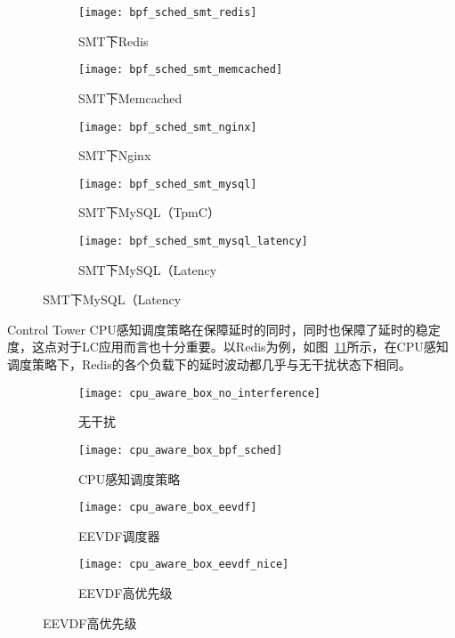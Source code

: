 \begin{figure}[H]
    \centering
    \begin{subfigure}[b]{0.32\textwidth}
        \texttt{[image: bpf\_sched\_smt\_redis]}
        \caption{\quad SMT下Redis}
        \label{fig:bpf_sched_smt_redis}
    \end{subfigure}
    \begin{subfigure}[b]{0.32\textwidth}
        \texttt{[image: bpf\_sched\_smt\_memcached]}
        \caption{\quad SMT下Memcached}
        \label{fig:bpf_sched_smt_memcached}
    \end{subfigure}
    \begin{subfigure}[b]{0.32\textwidth}
        \texttt{[image: bpf\_sched\_smt\_nginx]}
        \caption{\quad SMT下Nginx}
        \label{fig:bpf_sched_smt_nginx}
    \end{subfigure}
    \begin{subfigure}[b]{0.32\textwidth}
        \texttt{[image: bpf\_sched\_smt\_mysql]}
        \caption{\quad SMT下MySQL（TpmC）}
        \label{fig:bpf_sched_smt_mysql}
    \end{subfigure}
    \begin{subfigure}[b]{0.32\textwidth}
        \texttt{[image: bpf\_sched\_smt\_mysql\_latency]}
        \caption{\quad SMT下MySQL（Latency}
        \label{fig:bpf_sched_smt_mysql_latency}
    \end{subfigure}
\label{fig:lc_bpf_sched_smt}
\end{figure}

Control Tower CPU感知调度策略在保障延时的同时，同时也保障了延时的稳定度，这点对于LC应用而言也十分重要。以Redis为例，如图~\ref{fig:latency_box}所示，在CPU感知调度策略下，Redis的各个负载下的延时波动都几乎与无干扰状态下相同。

\begin{figure}[H]
    \centering
    \begin{subfigure}[b]{0.35\textwidth}
        \texttt{[image: cpu\_aware\_box\_no\_interference]}
        \caption{无干扰}
        \label{fig:cpu_aware_box_no_interference}
    \end{subfigure}
    \begin{subfigure}[b]{0.35\textwidth}
        \texttt{[image: cpu\_aware\_box\_bpf\_sched]}
        \caption{CPU感知调度策略}
        \label{fig:cpu_aware_box_bpf_sched}
    \end{subfigure}
    \begin{subfigure}[b]{0.35\textwidth}
        \texttt{[image: cpu\_aware\_box\_eevdf]}
        \caption{EEVDF调度器}
        \label{fig:cpu_aware_box_eevdf}
    \end{subfigure}
    \begin{subfigure}[b]{0.35\textwidth}
        \texttt{[image: cpu\_aware\_box\_eevdf\_nice]}
        \caption{EEVDF高优先级}
        \label{fig:cpu_aware_box_eevdf_nice}
    \end{subfigure}
\label{fig:latency_box}
\end{figure}

